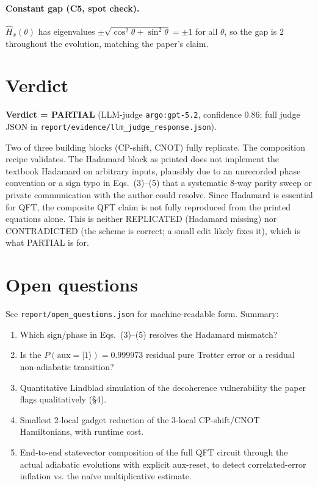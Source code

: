 \documentclass[11pt]{article}
\begin{document}
\paragraph{Constant gap (C5, spot check).} $\hat H_x(\theta)$ has eigenvalues $\pm\sqrt{\cos^2\theta+\sin^2\theta} = \pm 1$ for all $\theta$, so the gap is $2$ throughout the evolution, matching the paper's claim.

\section{Verdict}
\label{sec:verdict}

\textbf{Verdict = PARTIAL} (LLM-judge \texttt{argo:gpt-5.2}, confidence 0.86; full judge JSON in \texttt{report/evidence/llm\_judge\_response.json}).

Two of three building blocks (CP-shift, CNOT) fully replicate. The composition recipe validates. The Hadamard block as printed does not implement the textbook Hadamard on arbitrary inputs, plausibly due to an unrecorded phase convention or a sign typo in Eqs.~(3)--(5) that a systematic 8-way parity sweep or private communication with the author could resolve. Since Hadamard is essential for QFT, the composite QFT claim is not fully reproduced from the printed equations alone. This is neither REPLICATED (Hadamard missing) nor CONTRADICTED (the scheme is correct; a small edit likely fixes it), which is what PARTIAL is for.

\section{Open questions}
\label{sec:openq}

See \texttt{report/open\_questions.json} for machine-readable form. Summary:
\begin{enumerate}
\item Which sign/phase in Eqs.~(3)--(5) resolves the Hadamard mismatch?
\item Is the $P(\text{aux}=|1\rangle)=0.999973$ residual pure Trotter error or a residual non-adiabatic transition?
\item Quantitative Lindblad simulation of the decoherence vulnerability the paper flags qualitatively (\S 4).
\item Smallest 2-local gadget reduction of the 3-local CP-shift/CNOT Hamiltonians, with runtime cost.
\item End-to-end statevector composition of the full QFT circuit through the actual adiabatic evolutions with explicit aux-reset, to detect correlated-error inflation vs. the na\"ive multiplicative estimate.
\end{enumerate}
\end{document}
